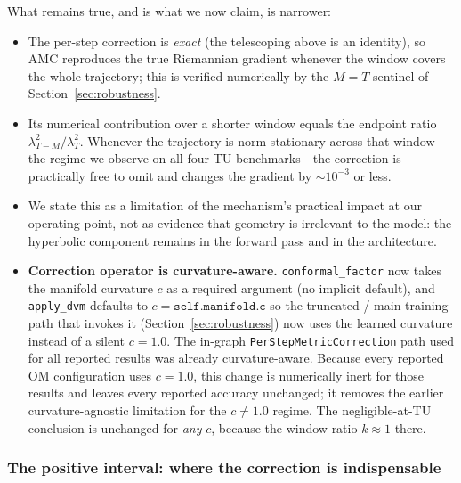 \documentclass[a4paper,fleqn]{cas-dc}
\begin{document}
What remains true, and is what we now claim, is narrower:

\begin{itemize}
    \item The per-step correction is \emph{exact} (the telescoping above is an identity), so AMC reproduces the true Riemannian gradient whenever the window covers the whole trajectory; this is verified numerically by the $M=T$ sentinel of Section~\ref{sec:robustness}.
    \item Its numerical contribution over a shorter window equals the endpoint ratio $\lambda_{T-M}^2/\lambda_T^2$. Whenever the trajectory is norm-stationary across that window---the regime we observe on all four TU benchmarks---the correction is practically free to omit and changes the gradient by $\sim10^{-3}$ or less.
    \item We state this as a limitation of the mechanism's practical impact at our operating point, not as evidence that geometry is irrelevant to the model: the hyperbolic component remains in the forward pass and in the architecture.
    \item \textbf{Correction operator is curvature-aware.} \texttt{conformal\_factor} now takes the manifold curvature $c$ as a required argument (no implicit default), and \texttt{apply\_dvm} defaults to $c{=}\texttt{self.manifold.c}$ so the truncated / main-training path that invokes it (Section~\ref{sec:robustness}) now uses the learned curvature instead of a silent $c{=}1.0$. The in-graph \texttt{PerStepMetricCorrection} path used for all reported results was already curvature-aware. Because every reported OM configuration uses $c{=}1.0$, this change is numerically inert for those results and leaves every reported accuracy unchanged; it removes the earlier curvature-agnostic limitation for the $c{\neq}1.0$ regime. The negligible-at-TU conclusion is unchanged for \emph{any} $c$, because the window ratio $k\approx1$ there.
\end{itemize}

\subsubsection{The positive interval: where the correction is indispensable}
\end{document}
